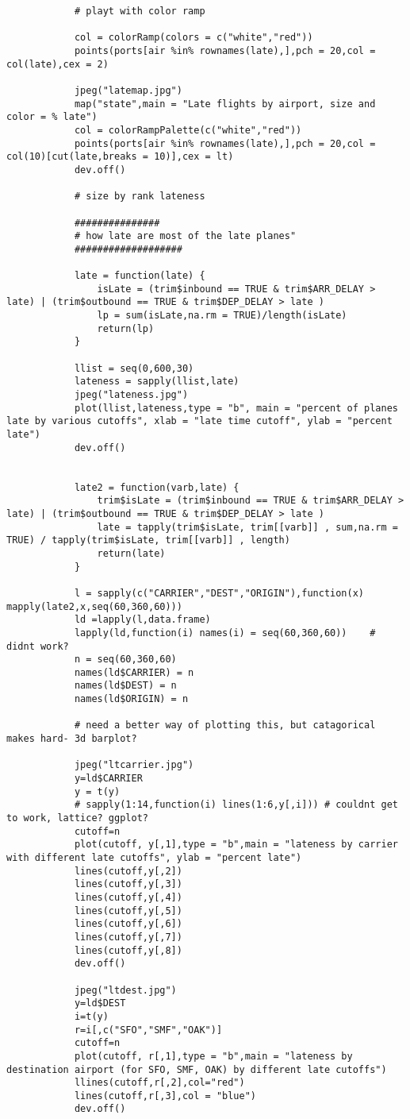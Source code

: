 \documentclass[12pt]{article}
\begin{document}
\begin{verbatim}
			# playt with color ramp

			col = colorRamp(colors = c("white","red"))
			points(ports[air %in% rownames(late),],pch = 20,col = col(late),cex = 2)

			jpeg("latemap.jpg")
			map("state",main = "Late flights by airport, size and color = % late")
			col = colorRampPalette(c("white","red"))
			points(ports[air %in% rownames(late),],pch = 20,col = col(10)[cut(late,breaks = 10)],cex = lt)
			dev.off()

			# size by rank lateness

			###############
			# how late are most of the late planes"
			###################

			late = function(late) {
				isLate = (trim$inbound == TRUE & trim$ARR_DELAY > late) | (trim$outbound == TRUE & trim$DEP_DELAY > late )
				lp = sum(isLate,na.rm = TRUE)/length(isLate)
				return(lp)
			}

			llist = seq(0,600,30)
			lateness = sapply(llist,late)
			jpeg("lateness.jpg")
			plot(llist,lateness,type = "b", main = "percent of planes late by various cutoffs", xlab = "late time cutoff", ylab = "percent late")
			dev.off()


			late2 = function(varb,late) {
				trim$isLate = (trim$inbound == TRUE & trim$ARR_DELAY > late) | (trim$outbound == TRUE & trim$DEP_DELAY > late )
				late = tapply(trim$isLate, trim[[varb]] , sum,na.rm = TRUE) / tapply(trim$isLate, trim[[varb]] , length)  
				return(late)
			}

			l = sapply(c("CARRIER","DEST","ORIGIN"),function(x) mapply(late2,x,seq(60,360,60)))
			ld =lapply(l,data.frame)
			lapply(ld,function(i) names(i) = seq(60,360,60))	# didnt work?
			n = seq(60,360,60)
			names(ld$CARRIER) = n
			names(ld$DEST) = n
			names(ld$ORIGIN) = n

			# need a better way of plotting this, but catagorical makes hard- 3d barplot?

			jpeg("ltcarrier.jpg")
			y=ld$CARRIER
			y = t(y)
			# sapply(1:14,function(i) lines(1:6,y[,i]))	# couldnt get to work, lattice? ggplot?
			cutoff=n
			plot(cutoff, y[,1],type = "b",main = "lateness by carrier with different late cutoffs", ylab = "percent late")
			lines(cutoff,y[,2])
			lines(cutoff,y[,3])
			lines(cutoff,y[,4])
			lines(cutoff,y[,5])
			lines(cutoff,y[,6])
			lines(cutoff,y[,7])
			lines(cutoff,y[,8])
			dev.off()

			jpeg("ltdest.jpg")
			y=ld$DEST
			i=t(y)
			r=i[,c("SFO","SMF","OAK")]
			cutoff=n
			plot(cutoff, r[,1],type = "b",main = "lateness by destination airport (for SFO, SMF, OAK) by different late cutoffs")
			llines(cutoff,r[,2],col="red")
			lines(cutoff,r[,3],col = "blue")
			dev.off()


\end{verbatim}
\end{document}

